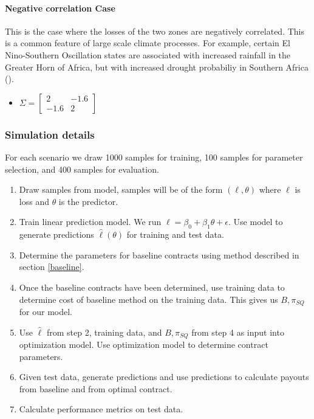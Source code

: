 \documentclass[11pt]{article}
\begin{document}
      \paragraph*{Negative correlation Case}
        This is the case where the losses of the two zones are negatively correlated. This is a common feature of large scale climate processes. For example, certain El Nino-Southern Oscillation states are associated with increased rainfall in the Greater Horn of Africa, but with increased drought probabiliy in Southern Africa (\cite{barrett2007poverty}). 
        \begin{itemize}
            \item $\Sigma = \begin{bmatrix}
                2 & -1.6 \\
                -1.6 & 2 
                \end{bmatrix} $
        \end{itemize}

    \subsubsection{Simulation details}
      For each scenario we draw 1000 samples for training, 100 samples for parameter selection, and 400 samples for evaluation.
      \begin{enumerate}
        \item Draw samples from model, samples will be of the form $(\ell,\theta)$ where $\ell$ is loss and $\theta$ is the predictor. 
        \item Train linear prediction model. We run $\ell = \beta_0 + \beta_1\theta +\epsilon$. Use model to generate predictions $\hat{\ell}(\theta)$ for training and test data. 
        \item Determine the parameters for baseline contracts using method described in section \ref{baseline}. 
        \item Once the baseline contracts have been determined, use training data to determine cost of baseline method on the training data. This gives us $B,\pi_{SQ}$ for our model. 
        \item Use $\hat{\ell}$ from step 2, training data, and $B, \pi_{SQ}$ from step 4 as input into optimization model. Use optimization  model to determine contract parameters. 
        \item Given test data, generate predictions and use predictions to calculate payouts from baseline and from optimal contract. 
        \item Calculate performance metrics on test data. 
      \end{enumerate}
\end{document}
